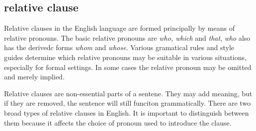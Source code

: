 \subsection{relative clause}

Relative clauses in the English language are formed principally by means of relative pronouns.
The basic relative pronouns are {\it who, which} and {\it that}, {\it who} also has the derivedc forms
{\it whom} and {\it whose}. Various gramatical rules and style guides determine which relative
pronouns may be suitable in various situations, especially for formal settings. In some cases the relative
pronoun may be omitted and merely implied.

Relative clauses are non-essential parts of a sentene. They may add meaning, but if they are removed, 
the sentence will still funciton grammatically. There are two broad types of relative clauses in English. 
It is important to distinguish between them because it affects the choice of pronoun 
used to introduce the clause.

